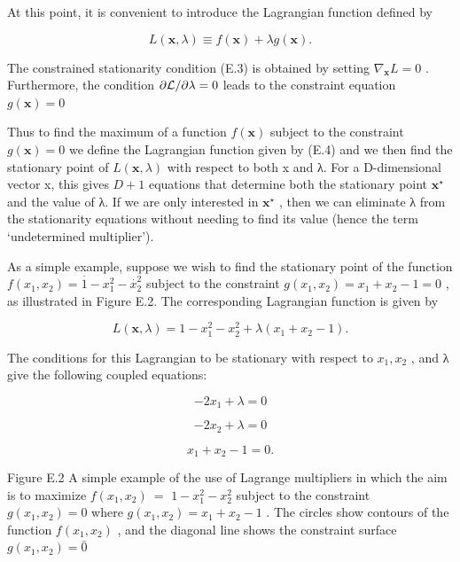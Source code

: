\documentclass[
  10
]{article}
\begin{document}
At this point, it is convenient to introduce the Lagrangian function
defined by

\[
L (\mathbf {x}, \lambda) \equiv f (\mathbf {x}) + \lambda g (\mathbf {x}).\tag{E.4}
\]

The constrained stationarity condition (E.3) is obtained by setting
\(\nabla _ { \mathbf x } L = 0\) . Furthermore, the condition
\(\partial { \cal L } / \partial \lambda = 0\) leads to the constraint
equation \(g ( \mathbf { x } ) = 0\)

Thus to find the maximum of a function \(f ( \mathbf { x } )\) subject
to the constraint \(g ( \mathbf { x } ) = 0\) we define the Lagrangian
function given by (E.4) and we then find the stationary point of
\(L ( \mathbf { x } , \lambda )\) with respect to both x and λ. For a
D-dimensional vector x, this gives \(D + 1\) equations that determine
both the stationary point \(\mathbf { x } ^ { \star }\) and the value of
λ. If we are only interested in \(\mathbf { x } ^ { \star }\) , then we
can eliminate λ from the stationarity equations without needing to find
its value (hence the term `undetermined multiplier').

As a simple example, suppose we wish to find the stationary point of the
function
\(f ( x _ { 1 } , x _ { 2 } ) = \overset { \cdot } { 1 } - x _ { 1 } ^ { 2 } - \overset { \cdot } { x } _ { 2 } ^ { 2 }\)
subject to the constraint
\(g ( x _ { 1 } , x _ { 2 } ) = x _ { 1 } + x _ { 2 } - 1 = 0\) , as
illustrated in Figure E.2. The corresponding Lagrangian function is
given by

\[
L (\mathbf {x}, \lambda) = 1 - x _ {1} ^ {2} - x _ {2} ^ {2} + \lambda (x _ {1} + x _ {2} - 1).\tag{E.5}
\]

The conditions for this Lagrangian to be stationary with respect to
\(x _ { 1 } , x _ { 2 }\) , and λ give the following coupled equations:

\[
- 2 x _ {1} + \lambda = 0\tag{E.6}
\]

\[
- 2 x _ {2} + \lambda = 0\tag{E.7}
\]

\[
x _ {1} + x _ {2} - 1 = 0.\tag{E.8}
\]

Figure E.2 A simple example of the use of Lagrange multipliers in which
the aim is to maximize \(f ( x _ { 1 } , x _ { 2 } ) ~ =\)
\(1 - x _ { 1 } ^ { 2 } - x _ { 2 } ^ { 2 }\) subject to the constraint
\(g ( x _ { 1 } , x _ { 2 } ) = 0\) where
\(g ( x _ { 1 } , x _ { 2 } ) = x _ { 1 } + x _ { 2 } - 1\) . The
circles show contours of the function \(f ( x _ { 1 } , x _ { 2 } )\) ,
and the diagonal line shows the constraint surface
\(g ( x _ { 1 } , x _ { 2 } ) = \bar { 0 }\)
\end{document}
